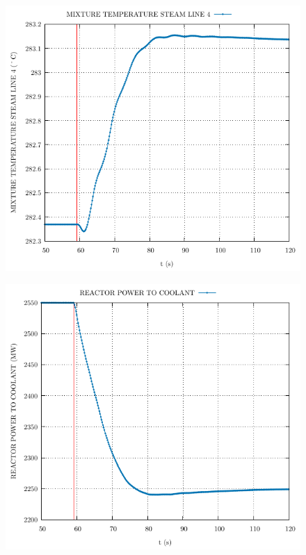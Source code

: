 \documentclass{article}
\begin{document}
\begin{multicols}{2}
\begin{figure}[H]
\end{figure}
\begin{figure}[H]
\centering
\includegraphics[width=\linewidth]{./graphs/MIXTURE TEMPERATURE STEAM LINE 4_comp.pdf}
\end{figure}
\begin{figure}[H]
\centering
\includegraphics[width=\linewidth]{./graphs/REACTOR POWER TO COOLANT_comp.pdf}

\end{figure}
\end{multicols}
\end{document}
